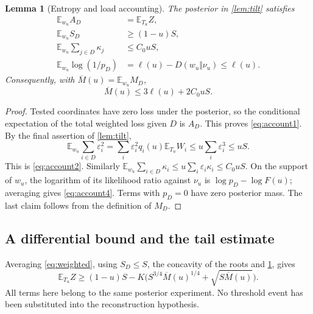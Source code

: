 \documentclass[11pt,reqno]{amsart}
\numberwithin{equation}{section}
\newtheorem{lemma}[theorem]{Lemma}
\theoremstyle{definition}
\theoremstyle{remark}
\newcommand{\E}{\mathbb E}
\newcommand{\eps}{\varepsilon}
\begin{document}
\begin{lemma}[Entropy and load accounting]\label{lem:account}
The posterior in \cref{lem:tilt} satisfies
\begin{align}
 \E_{w_u}A_D&=\E_{T_u}Z,\label{eq:account1}\\
 \E_{w_u}S_D&\ge(1-u)S,\label{eq:account2}\\
 \E_{w_u}\sum_{j\in D}\kappa_j&\le C_0uS,\label{eq:account3}\\
 \E_{w_u}\log(1/p_D)
 &=\ell(u)-D(w_u\Vert\nu_u)\le\ell(u).\label{eq:account4}
\end{align}
Consequently, with \(\overline M(u)=\E_{w_u}M_D\),
\begin{equation}\label{eq:Mbar}
 \overline M(u)\le3\ell(u)+2C_0uS.
\end{equation}
\end{lemma}
\begin{proof}
Tested coordinates have zero loss under the posterior, so the conditional expectation of the total weighted loss given \(D\) is \(A_D\). This proves \eqref{eq:account1}. By the final assertion of \cref{lem:tilt},
\[
 \E_{w_u}\sum_{i\in D}\eps_i^2
 =\sum_i\eps_i^2q_i(u)\E_{T_u}W_i
 \le u\sum_i\eps_i^3\le uS.
\]
This is \eqref{eq:account2}. Similarly
\(\E_{w_u}\sum_{i\in D}\kappa_i\le
u\sum_i\eps_i\kappa_i\le C_0uS\).
On the support of \(w_u\), the logarithm of its likelihood ratio against \(\nu_u\) is \(\log p_D-\log F(u)\); averaging gives \eqref{eq:account4}. Terms with \(p_D=0\) have zero posterior mass. The last claim follows from the definition of \(M_D\).
\end{proof}

\subsection{A differential bound and the tail estimate}
Averaging \eqref{eq:weighted}, using \(S_D\le S\), the concavity of the roots and \cref{lem:account}, gives
\begin{equation}\label{eq:tiltedloss}
 \E_{T_u}Z\ge(1-u)S
 -K\bigl(S^{3/4}\overline M(u)^{1/4}
                  +\sqrt{S\overline M(u)}\bigr).
\end{equation}
All terms here belong to the same posterior experiment. No threshold event has been substituted into the reconstruction hypothesis.
\end{document}
